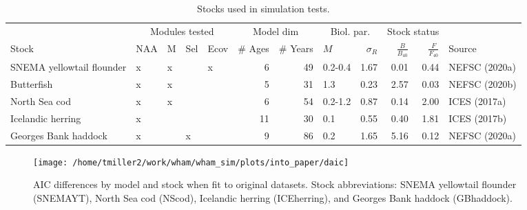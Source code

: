 \documentclass[]{article}
\begin{document}
\begin{landscape}
\begin{table}

\caption{\label{tab:stock-list}Stocks used in simulation tests.}
\centering
\begin{tabular}[t]{lllllrrlrrrl}
\toprule
\multicolumn{1}{c}{ } & \multicolumn{4}{c}{Modules tested} & \multicolumn{2}{c}{Model dim} & \multicolumn{2}{c}{Biol. par.} & \multicolumn{2}{c}{Stock status} \\
\cmidrule(l{3pt}r{3pt}){2-5} \cmidrule(l{3pt}r{3pt}){6-7} \cmidrule(l{3pt}r{3pt}){8-9} \cmidrule(l{3pt}r{3pt}){10-11}
Stock & NAA & M & Sel & Ecov & \# Ages & \# Years & $M$ & $\sigma_R$ & $\frac{B}{B_{40}}$ & $\frac{F}{F_{40}}$ & Source\\
\midrule
SNEMA yellowtail flounder & x & x &  & x & 6 & 49 & 0.2-0.4 & 1.67 & 0.01 & 0.44 & NEFSC (2020a)\\
Butterfish & x & x &  &  & 5 & 31 & 1.3 & 0.23 & 2.57 & 0.03 & NEFSC (2020b)\\
North Sea cod & x & x &  &  & 6 & 54 & 0.2-1.2 & 0.87 & 0.14 & 2.00 & ICES (2017a)\\
Icelandic herring & x &  &  &  & 11 & 30 & 0.1 & 0.55 & 0.40 & 1.81 & ICES (2017b)\\
Georges Bank haddock & x &  & x &  & 9 & 86 & 0.2 & 1.65 & 5.16 & 0.12 & NEFSC (2020a)\\
\bottomrule
\end{tabular}
\end{table}
\end{landscape}

\pagebreak

\begin{landscape}
\begin{figure}

{\centering \texttt{[image: /home/tmiller2/work/wham/wham\_sim/plots/into\_paper/daic]} 

}

\caption{AIC differences by model and stock when fit to original datasets. Stock abbreviations: SNEMA yellowtail flounder (SNEMAYT), North Sea cod (NScod), Icelandic herring (ICEherring), and Georges Bank haddock (GBhaddock).}\label{fig:daic}
\end{figure}
\end{landscape}

\pagebreak
\end{document}
